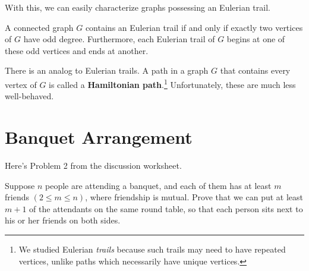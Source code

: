 \documentclass[11 pt]{scrartcl}
\begin{document}
With this, we can easily characterize graphs possessing an Eulerian trail.
\begin{corollary}
    A connected graph $G$ contains an Eulerian trail if and only if exactly two vertices of $G$ have odd degree. Furthermore, each Eulerian trail of $G$ begins at one of these odd vertices and ends at another.
    \label{cor:euler}
\end{corollary}

There is an analog to Eulerian trails. A path in a graph $G$ that contains every vertex of $G$ is called a \textbf{Hamiltonian path}.\footnote{We studied Eulerian \textit{trails} because such trails may need to have repeated vertices, unlike paths which necessarily have unique vertices.} Unfortunately, these are much less well-behaved.

\section{Banquet Arrangement}
Here's Problem 2 from the discussion worksheet. 
\begin{problem}
    Suppose $n$ people are attending a banquet, and each of them has at least $m$ friends $(2\leq m\leq n)$, where friendship is mutual.  
    Prove that we can put at least $m+1$ of the attendants on the same round table, so that each person sits next to his or her friends on both sides.
\end{problem}
\end{document}
